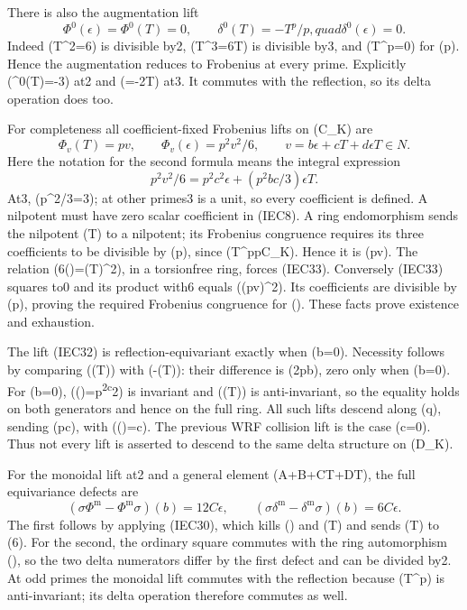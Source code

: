 \documentclass[
]{article}
\begin{document}
There is also the augmentation lift \[
\Phi^0(\epsilon)=\Phi^0(T)=0,\qquad
\delta^0(T)=-T^p/p,quad\delta^0(\epsilon)=0.
\tag{IEC31}
\] Indeed (T\^{}2=6\epsilon) is divisible by2, (T\^{}3=6\epsilon T) is
divisible by3, and (T\^{}p=0) for (p). Hence the augmentation
reduces to Frobenius at every prime. Explicitly
(\delta\^{}0(T)=-3\epsilon) at2 and (=-2\epsilon T) at3. It commutes
with the reflection, so its delta operation does too.

For completeness all coefficient-fixed Frobenius lifts on (C\_K) are \[
\Phi_v(T)=p v,\qquad \Phi_v(\epsilon)=p^2v^2/6,
\qquad v=b\epsilon+cT+d\epsilon T\in N.
\tag{IEC32}
\] Here the notation for the second formula means the integral
expression \[
p^2v^2/6=p^2c^2\epsilon+(p^2bc/3)\epsilon T.
\tag{IEC33}
\] At3, (p\^{}2/3=3); at other primes3 is a unit, so every coefficient
is defined. A nilpotent must have zero scalar coefficient in (IEC8). A
ring endomorphism sends the nilpotent (T) to a nilpotent; its Frobenius
congruence requires its three coefficients to be divisible by (p), since
(T\^{}p\in pC\_K). Hence it is (pv). The relation
(6\Phi(\epsilon)=\Phi(T)\^{}2), in a torsionfree ring, forces (IEC33).
Conversely (IEC33) squares to0 and its product with6 equals ((pv)\^{}2).
Its coefficients are divisible by (p), proving the required Frobenius
congruence for (\epsilon). These facts prove existence and exhaustion.

The lift (IEC32) is reflection-equivariant exactly when (b=0). Necessity
follows by comparing (\sigma\Phi(T)) with (-\Phi(T)): their difference
is (2pb\epsilon), zero only when (b=0). For (b=0),
(\Phi(\epsilon)=p\textsuperscript{2c}2\epsilon) is invariant and
(\Phi(T)) is anti-invariant, so the equality holds on both generators
and hence on the full ring. All such lifts descend along (q), sending
(\eta\mapsto pc\eta), with (\delta(\eta)=c\eta). The previous WRF
collision lift is the case (c=0). Thus not every lift is asserted to
descend to the same delta structure on (D\_K).

For the monoidal lift at2 and a general element
(A+B\epsilon+CT+D\epsilon T), the full equivariance defects are \[
(\sigma\Phi^{\mathrm m}-\Phi^{\mathrm m}\sigma)(b)=12C\epsilon,
\qquad
(\sigma\delta^{\mathrm m}-\delta^{\mathrm m}\sigma)(b)=6C\epsilon.
\tag{IEC34}
\] The first follows by applying (IEC30), which kills (\epsilon) and
(\epsilon T) and sends (T) to (6\epsilon). For the second, the ordinary
square commutes with the ring automorphism (\sigma), so the two delta
numerators differ by the first defect and can be divided by2. At odd
primes the monoidal lift commutes with the reflection because (T\^{}p)
is anti-invariant; its delta operation therefore commutes as well.
\end{document}
